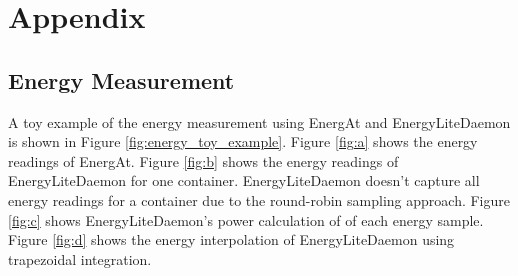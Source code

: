 \documentclass[times, 10pt,twocolumn]{article}
\begin{document}



\appendix
\section{Appendix}
\subsection{Energy Measurement}
\label{appendix:energy_measurement}
A toy example of the energy measurement using EnergAt and EnergyLiteDaemon is shown in Figure \ref{fig:energy_toy_example}. Figure \ref{fig:a} shows the energy readings of EnergAt. Figure \ref{fig:b} shows the energy readings of EnergyLiteDaemon for one container. EnergyLiteDaemon doesn't capture all energy readings for a container due to the round-robin sampling approach. Figure \ref{fig:c} shows EnergyLiteDaemon's power calculation of of each energy sample. Figure \ref{fig:d} shows the energy interpolation of EnergyLiteDaemon using trapezoidal integration.
\end{document}
